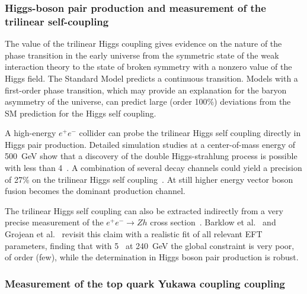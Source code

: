 \subsubsection{Higgs-boson pair production and measurement 
of the trilinear self-coupling}
\label{subsubsec:highE:tripleHiggs}

The value of the trilinear Higgs coupling gives evidence on the nature of the phase
transition  in  the  early  universe  from  the  symmetric  state  of  the  weak  interaction
theory to the state of broken symmetry with a nonzero value of the Higgs field. The
Standard Model predicts a continuous transition. Models with a first-order phase transition,
which may provide an explanation for the baryon asymmetry of the universe,
can predict large (order 100\%) deviations from the SM prediction for the Higgs self coupling.

A high-energy $e^+e^-$ collider can probe the trilinear Higgs self coupling directly in Higgs pair production.
Detailed simulation studies at a center-of-mass energy of 500~GeV show that a discovery of the
double Higgs-strahlung process is possible with less than 4~\iab. A combination of several decay channels
could yield a precision of 27\% on the trilinear Higgs self coupling~\cite{Duerig:2016dvi}.
At still higher energy vector boson fusion becomes the dominant production channel.


The trilinear Higgs self coupling can also be extracted indirectly from a very precise
measurement of the $e^+ e^- \rightarrow Zh$ cross section~\cite{McCullough:2013rea}. Barklow et al.~\cite{Barklow:2017awn}
and Grojean et al.~\cite{DiVita:2017vrr} revisit this claim with a realistic fit of
all relevant EFT parameters, finding that with 5~\iab{} at 240~GeV
the global constraint is very poor, of order (few), while the determination in Higgs boson pair production is robust. 

\subsubsection{Measurement of the top quark Yukawa coupling coupling}
\label{subsubsec:highE:topYukawa}

